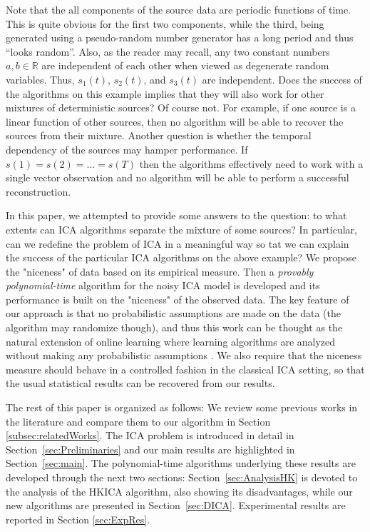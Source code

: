 \documentclass[twoside,11pt]{article}
\newcommand{\real}{\mathbb{R}}
\begin{document}
Note that the all components of the source data are periodic functions of time. 
This is quite obvious for the first two components, while the third, being generated using a pseudo-random number generator has a long period and thus ``looks random''.
Also, as the reader may recall, any two constant numbers $a,b \in \real$ are independent of each other when viewed as degenerate random variables. Thus, $s_1(t)$, $s_2(t)$, and $s_3(t)$ are independent. 
Does the success of the algorithms on this example implies that they will also work for other mixtures of deterministic sources? Of course not. 
For example, if one source is a linear function of other sources, then no algorithm will be able to recover the sources from their mixture.
 Another question is whether the temporal dependency of the sources may hamper performance. 
If $s(1) = s(2) = \dots = s(T)$ then the algorithms effectively need to work with a single vector observation and no algorithm will be able to perform a successful reconstruction. 

In this paper, we attempted to provide some answers to the question: to what extents can ICA algorithms separate the mixture of some sources? 
In particular, can we redefine the problem of ICA in a meaningful way so tat we can explain the success of the particular ICA algorithms on the above example?
We propose the "niceness" of data based on its empirical measure. 
Then a \emph{provably polynomial-time} algorithm for the noisy ICA model is developed and its performance is built on the "niceness" of the observed data. 
The key feature of our approach is that no probabilistic assumptions are made on the data (the algorithm may randomize though), and thus this work can be thought as the natural extension of online learning
where learning algorithms are analyzed without making any probabilistic assumptions \citep{CBLu06:book}.
We also require that the niceness measure should behave in a controlled fashion in the classical ICA setting, so that the usual statistical results can be recovered from our results. 

The rest of this paper is organized as follows: 
We review some previous works in the literature and compare them to our algorithm in Section \ref{subsec:relatedWorks}.
The ICA problem is introduced in detail in Section~\ref{sec:Preliminaries} and  our main results are highlighted in Section~\ref{sec:main}.
The polynomial-time algorithms underlying these results are developed through the next two sections: Section~\ref{sec:AnalysisHK} is devoted to the analysis of the HKICA algorithm, also showing its disadvantages, while our new algorithms are presented in Section~\ref{sec:DICA}.
Experimental results are reported in Section \ref{sec:ExpRes}.
\end{document}
